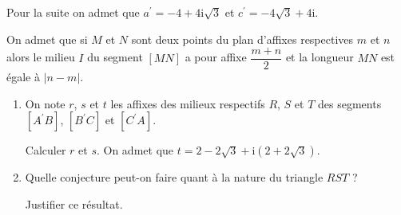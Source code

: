 \begin{enumerate}
     Pour la suite on admet que $a^\prime = -4+4\text{i}\sqrt{3}$ et $c^\prime =-4\sqrt{3}+4\text{i}$.
     \par
     On admet que si $M$ et $N$ sont deux points du plan d'affixes respectives $m$ et $n$ alors le milieu $I$ du segment $[MN]$ a pour affixe $\dfrac{m+n}{2}$ et la longueur $MN$ est égale à $|n-m|$.
     \begin{enumerate}[label=\alph*.] 
          \item
          On note $r$, $s$ et $t$ les affixes des milieux respectifs $R$, $S$ et $T$ des segments $[A^\prime B]$, $[B^\prime C]$ et $[C^\prime A]$.
          \par
          Calculer $r$ et $s$. On admet que $t = 2-2\sqrt{3}+\text{i}\left(2+2\sqrt{3}\right)$.
          \item
          Quelle conjecture peut-on faire quant à la nature du triangle $RST$ ?
          \par
          Justifier ce résultat.
     \end{enumerate}
\end{enumerate}
